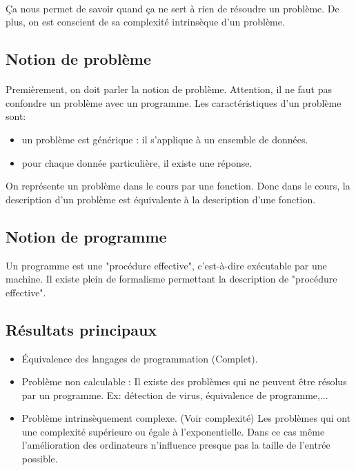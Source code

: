\documentclass[11pt,a4paper]{article}
\theoremstyle{definition}
\begin{document}
\paragraph{}
\label{par:}
Ça nous permet de savoir quand ça ne sert à rien de résoudre un problème.
De plus, on est conscient de sa complexité intrinsèque d'un
problème.

\subsection{Notion de problème}
\label{subsec:notion_de_probl_me}

\paragraph{}
\label{par:}
Premièrement, on doit parler la notion de problème.
Attention, il ne faut pas confondre un problème avec un programme.
Les caractéristiques d'un problème sont:

\begin{itemize}
	\item un problème est générique : il s'applique à un ensemble de données.
	\item pour chaque donnée particulière, il existe une réponse.
\end{itemize}
On représente un problème dans le cours par une fonction. Donc dans le cours,
la description d'un problème est équivalente à la description d'une fonction.

\subsection{Notion de programme}
\label{ssub:notion_de_programme}

Un programme est une "procédure effective", c'est-à-dire exécutable par une machine.
Il existe plein de formalisme permettant la description de "procédure effective".


\subsection{Résultats principaux}
\label{sub:r_sultat_principaux}

\begin{itemize}
	\item Équivalence des langages de programmation (Complet).
	\item Problème non calculable : Il existe des problèmes qui ne peuvent 
		être résolus par un programme. Ex: détection de virus, équivalence
		de programme,...
	\item Problème intrinsèquement complexe. (Voir complexité) Les problèmes
		qui ont une complexité supérieure ou égale à l'exponentielle. Dans
		ce cas même l'amélioration des ordinateurs n'influence presque pas
		la taille de l'entrée possible.
\end{itemize}
\end{document}
